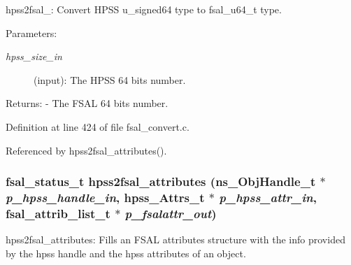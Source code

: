 hpss2fsal\_: Convert HPSS u\_\-signed64 type to fsal\_\-u64\_\-t type.

\begin{Desc}
\item[Parameters:]
\begin{description}
\item[{\em hpss\_\-size\_\-in}](input): The HPSS 64 bits number.\end{description}
\end{Desc}
\begin{Desc}
\item[Returns:]- The FSAL 64 bits number. \end{Desc}


Definition at line 424 of file fsal\_\-convert.c.

Referenced by hpss2fsal\_\-attributes().
\subsubsection{\setlength{\rightskip}{0pt plus 5cm}fsal\_\-status\_\-t hpss2fsal\_\-attributes (ns\_\-Obj\-Handle\_\-t $\ast$ {\em p\_\-hpss\_\-handle\_\-in}, hpss\_\-Attrs\_\-t $\ast$ {\em p\_\-hpss\_\-attr\_\-in}, fsal\_\-attrib\_\-list\_\-t $\ast$ {\em p\_\-fsalattr\_\-out})}\label{fsal__convert_8c_a14}


hpss2fsal\_\-attributes: Fills an FSAL attributes structure with the info provided by the hpss handle and the hpss attributes of an object.


